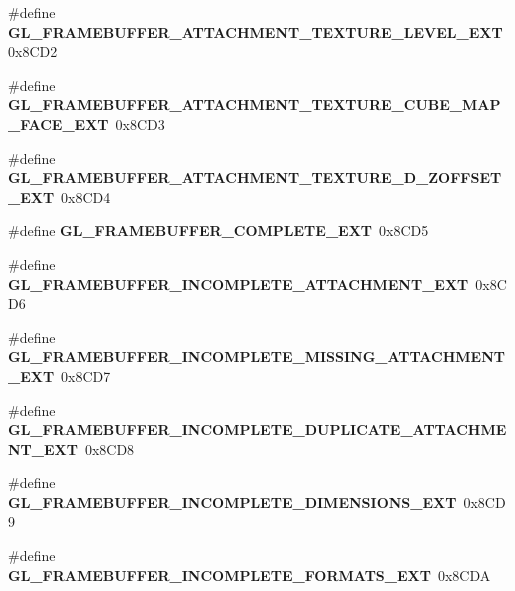 \begin{DoxyCompactItemize}
\item 
\#define {\bfseries G\+L\+\_\+\+F\+R\+A\+M\+E\+B\+U\+F\+F\+E\+R\+\_\+\+A\+T\+T\+A\+C\+H\+M\+E\+N\+T\+\_\+\+T\+E\+X\+T\+U\+R\+E\+\_\+\+L\+E\+V\+E\+L\+\_\+\+E\+X\+T}~0x8\+C\+D2\label{_s_d_l__opengl_8h_a38a86ff657d1bb669c30d5d71328a49a}

\item 
\#define {\bfseries G\+L\+\_\+\+F\+R\+A\+M\+E\+B\+U\+F\+F\+E\+R\+\_\+\+A\+T\+T\+A\+C\+H\+M\+E\+N\+T\+\_\+\+T\+E\+X\+T\+U\+R\+E\+\_\+\+C\+U\+B\+E\+\_\+\+M\+A\+P\+\_\+\+F\+A\+C\+E\+\_\+\+E\+X\+T}~0x8\+C\+D3\label{_s_d_l__opengl_8h_a770d657a3b2065f9f3d86b73112d7520}

\item 
\#define {\bfseries G\+L\+\_\+\+F\+R\+A\+M\+E\+B\+U\+F\+F\+E\+R\+\_\+\+A\+T\+T\+A\+C\+H\+M\+E\+N\+T\+\_\+\+T\+E\+X\+T\+U\+R\+E\+\_\+D\+\_\+\+Z\+O\+F\+F\+S\+E\+T\+\_\+\+E\+X\+T}~0x8\+C\+D4\label{_s_d_l__opengl_8h_afb4c713e2e7c1eaa4b60735d4a1f0dd1}

\item 
\#define {\bfseries G\+L\+\_\+\+F\+R\+A\+M\+E\+B\+U\+F\+F\+E\+R\+\_\+\+C\+O\+M\+P\+L\+E\+T\+E\+\_\+\+E\+X\+T}~0x8\+C\+D5\label{_s_d_l__opengl_8h_a4e59e117d25bea953dfa017e08d1c3d3}

\item 
\#define {\bfseries G\+L\+\_\+\+F\+R\+A\+M\+E\+B\+U\+F\+F\+E\+R\+\_\+\+I\+N\+C\+O\+M\+P\+L\+E\+T\+E\+\_\+\+A\+T\+T\+A\+C\+H\+M\+E\+N\+T\+\_\+\+E\+X\+T}~0x8\+C\+D6\label{_s_d_l__opengl_8h_a268da796c680af213faff739cfdd91b9}

\item 
\#define {\bfseries G\+L\+\_\+\+F\+R\+A\+M\+E\+B\+U\+F\+F\+E\+R\+\_\+\+I\+N\+C\+O\+M\+P\+L\+E\+T\+E\+\_\+\+M\+I\+S\+S\+I\+N\+G\+\_\+\+A\+T\+T\+A\+C\+H\+M\+E\+N\+T\+\_\+\+E\+X\+T}~0x8\+C\+D7\label{_s_d_l__opengl_8h_a9da899ca15cb6f3b95a56e015498eb65}

\item 
\#define {\bfseries G\+L\+\_\+\+F\+R\+A\+M\+E\+B\+U\+F\+F\+E\+R\+\_\+\+I\+N\+C\+O\+M\+P\+L\+E\+T\+E\+\_\+\+D\+U\+P\+L\+I\+C\+A\+T\+E\+\_\+\+A\+T\+T\+A\+C\+H\+M\+E\+N\+T\+\_\+\+E\+X\+T}~0x8\+C\+D8\label{_s_d_l__opengl_8h_a4495f7dce20c9643acaf77044a827530}

\item 
\#define {\bfseries G\+L\+\_\+\+F\+R\+A\+M\+E\+B\+U\+F\+F\+E\+R\+\_\+\+I\+N\+C\+O\+M\+P\+L\+E\+T\+E\+\_\+\+D\+I\+M\+E\+N\+S\+I\+O\+N\+S\+\_\+\+E\+X\+T}~0x8\+C\+D9\label{_s_d_l__opengl_8h_a40dd75292fef8732b397a1bf4241631c}

\item 
\#define {\bfseries G\+L\+\_\+\+F\+R\+A\+M\+E\+B\+U\+F\+F\+E\+R\+\_\+\+I\+N\+C\+O\+M\+P\+L\+E\+T\+E\+\_\+\+F\+O\+R\+M\+A\+T\+S\+\_\+\+E\+X\+T}~0x8\+C\+D\+A\label{_s_d_l__opengl_8h_aef8caac76934dfb6688f086595be9d18}


\end{DoxyCompactItemize}
